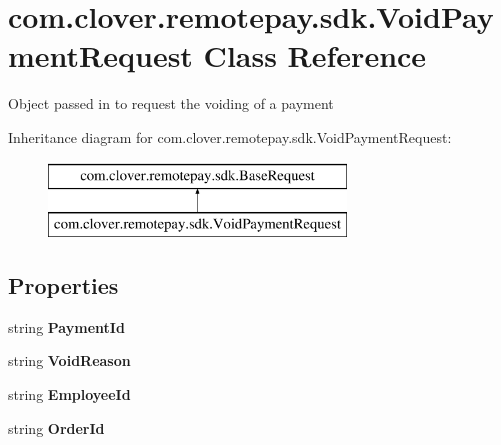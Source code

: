 \hypertarget{classcom_1_1clover_1_1remotepay_1_1sdk_1_1_void_payment_request}{}\section{com.\+clover.\+remotepay.\+sdk.\+Void\+Payment\+Request Class Reference}
\label{classcom_1_1clover_1_1remotepay_1_1sdk_1_1_void_payment_request}


Object passed in to request the voiding of a payment  


Inheritance diagram for com.\+clover.\+remotepay.\+sdk.\+Void\+Payment\+Request\+:\begin{figure}[H]
\begin{center}
\leavevmode
\includegraphics[height=2.000000cm]{classcom_1_1clover_1_1remotepay_1_1sdk_1_1_void_payment_request}
\end{center}
\end{figure}
\subsection*{Properties}
\begin{DoxyCompactItemize}
\item 
\mbox{\label{classcom_1_1clover_1_1remotepay_1_1sdk_1_1_void_payment_request_ad6cabb80cc9a585efa4d36e5d187f7d0}} 
string {\bfseries Payment\+Id}
\item 
\mbox{\label{classcom_1_1clover_1_1remotepay_1_1sdk_1_1_void_payment_request_a90b8ef7283baba36861dcd5ee115af6a}} 
string {\bfseries Void\+Reason}
\item 
\mbox{\label{classcom_1_1clover_1_1remotepay_1_1sdk_1_1_void_payment_request_a3b64c5c2a8e63313e64a70869aa61820}} 
string {\bfseries Employee\+Id}
\item 
\mbox{\label{classcom_1_1clover_1_1remotepay_1_1sdk_1_1_void_payment_request_adbffbb3a5cd23b3419d9e749036b6d4b}} 
string {\bfseries Order\+Id}
\end{DoxyCompactItemize}


